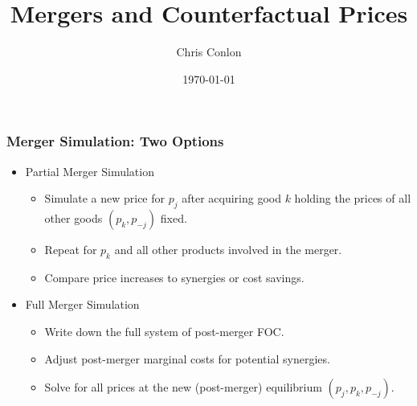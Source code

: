 \def\beamerclassoptions{[xcolor=pdftex,dvipsnames,table,mathserif,aspectratio=169]}



\usepackage[english]{babel}
\usepackage{pgf,pgfarrows,pgfnodes,pgfautomata,pgfheaps}
\usepackage{amsmath,amssymb,setspace,centernot}
\usepackage[latin1]{inputenc}
\usepackage[T1]{fontenc}
\usepackage{relsize}
\usepackage{stmaryrd}
\usepackage{pdfpages}
\usepackage{booktabs}
\usepackage[absolute,overlay]{textpos} 


\newenvironment{reference}[2]{%
  \begin{textblock*}{\textwidth}(#1,#2) 
      \footnotesize\it\bgroup\color{red!50!black}}{\egroup\end{textblock*}} 


\title{Mergers and Counterfactual Prices}
\author{Chris Conlon}
\date{\today}

\frame{\titlepage}

\begin{frame}
\frametitle{Merger Simulation: Two Options}
 \begin{itemize}
\item Partial Merger Simulation
 \begin{itemize}
\item Simulate a new price for $p_j$ after acquiring good $k$ holding the prices of all other goods $(p_k,p_{-j})$ fixed.
\item Repeat for $p_k$ and all other products involved in the merger.
\item Compare price increases to \alert{synergies} or cost savings.
 \end{itemize}
 \item Full Merger Simulation
 \begin{itemize}
\item Write down the full system of post-merger FOC.
\item Adjust post-merger marginal costs for potential synergies.
\item Solve for all prices at the new (post-merger) equilibrium $(p_j,p_k,p_{-j})$.
 \end{itemize}
 \end{itemize}
\end{frame}

